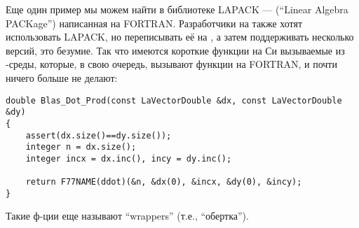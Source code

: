 Еще один пример мы можем найти в библиотеке LAPACK --- (``Linear Algebra PACKage'') написанная на FORTRAN.
Разработчики на \CCpp также хотят использовать LAPACK, но переписывать её на \CCpp, а затем поддерживать несколько версий,
это безумие.
Так что имеются короткие функции на Си вызываемые из \CCpp{}-среды, которые, в свою очередь, вызывают функции на FORTRAN,
и почти ничего больше не делают:

\begin{lstlisting}[style=customc]
double Blas_Dot_Prod(const LaVectorDouble &dx, const LaVectorDouble &dy)
{
    assert(dx.size()==dy.size());
    integer n = dx.size();
    integer incx = dx.inc(), incy = dy.inc();

    return F77NAME(ddot)(&n, &dx(0), &incx, &dy(0), &incy);
}
\end{lstlisting}

Такие ф-ции еще называют ``wrappers'' (т.е., ``обертка'').

